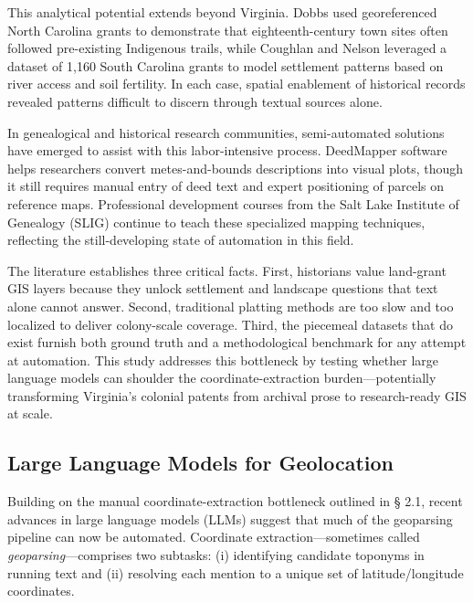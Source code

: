 This analytical potential extends beyond Virginia. Dobbs
\citep{Dobbs2009_backcountry} used georeferenced North Carolina grants
to demonstrate that eighteenth-century town sites often followed
pre-existing Indigenous trails, while Coughlan and Nelson
\citep{Coughlan2018_settlement} leveraged a dataset of 1,160 South
Carolina grants to model settlement patterns based on river access and
soil fertility. In each case, spatial enablement of historical records
revealed patterns difficult to discern through textual sources alone.

In genealogical and historical research communities, semi-automated
solutions have emerged to assist with this labor-intensive process.
DeedMapper software \citep{DeedMapper_software} helps researchers
convert metes-and-bounds descriptions into visual plots, though it still
requires manual entry of deed text and expert positioning of parcels on
reference maps. Professional development courses from the Salt Lake
Institute of Genealogy (SLIG) continue to teach these specialized
mapping techniques, reflecting the still-developing state of automation
in this field.

The literature establishes three critical facts. First, historians value
land-grant GIS layers because they unlock settlement and landscape
questions that text alone cannot answer. Second, traditional platting
methods are too slow and too localized to deliver colony-scale coverage.
Third, the piecemeal datasets that do exist furnish both ground truth
and a methodological benchmark for any attempt at automation. This study
addresses this bottleneck by testing whether large language models can
shoulder the coordinate-extraction burden---potentially transforming
Virginia's colonial patents from archival prose to research-ready GIS at
scale.

\subsection{Large Language Models for
Geolocation}\label{large-language-models-for-geolocation}

Building on the manual coordinate-extraction bottleneck outlined in §
2.1, recent advances in large language models (LLMs) suggest that much
of the geoparsing pipeline can now be automated. Coordinate
extraction---sometimes called \emph{geoparsing}---comprises two
subtasks: (i) identifying candidate toponyms in running text and (ii)
resolving each mention to a unique set of latitude/longitude
coordinates.

